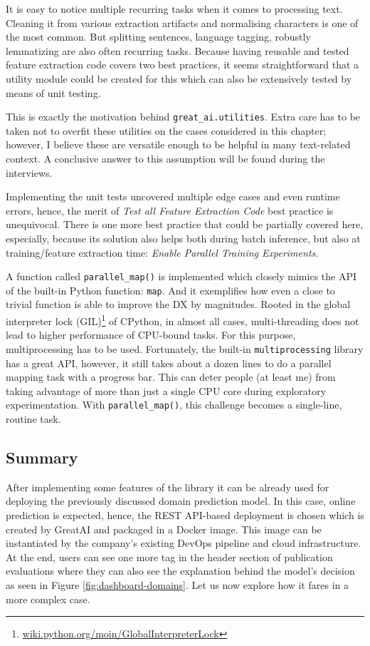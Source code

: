 It is easy to notice multiple recurring tasks when it comes to processing text. Cleaning it from various extraction artifacts and normalising characters is one of the most common. But splitting sentences, language tagging, robustly lemmatizing are also often recurring tasks. Because having reusable and tested feature extraction code covers two best practices, it seems straightforward that a utility module could be created for this which can also be extensively tested by means of unit testing.

This is exactly the motivation behind \texttt{great\_ai.utilities}. Extra care has to be taken not to overfit these utilities on the cases considered in this chapter; however, I believe these are versatile enough to be helpful in many text-related context. A conclusive answer to this assumption will be found during the interviews.

Implementing the unit tests uncovered multiple edge cases and even runtime errors, hence, the merit of \textit{Test all Feature Extraction Code} best practice is unequivocal. There is one more best practice that could be partially covered here, especially, because its solution also helps both during batch inference, but also at training/feature extraction time: \textit{Enable Parallel Training Experiments}.

A function called \texttt{parallel\_map()} is implemented which closely mimics the API of the built-in Python function: \texttt{map}. And it exemplifies how even a close to trivial function is able to improve the DX by magnitudes. Rooted in the global interpreter lock (GIL)\footnote{\href{https://wiki.python.org/moin/GlobalInterpreterLock}{wiki.python.org/moin/GlobalInterpreterLock}} of CPython, in almost all cases, multi-threading does not lead to higher performance of CPU-bound tasks. For this purpose, multiprocessing has to be used. Fortunately, the built-in \texttt{multiprocessing} library has a great API, however, it still takes about a dozen lines to do a parallel mapping task with a progress bar. This can deter people (at least me) from taking advantage of more than just a single CPU core during exploratory experimentation. With \texttt{parallel\_map()}, this challenge becomes a single-line, routine task. 

\subsection{Summary}

After implementing some features of the library it can be already used for deploying the previously discussed domain prediction model. In this case, online prediction is expected, hence, the REST API-based deployment is chosen which is created by GreatAI and packaged in a Docker image. This image can be instantiated by the company's existing DevOps pipeline and cloud infrastructure. At the end, users can see one more tag in the header section of publication evaluations where they can also see the explanation behind the model's decision as seen in Figure \ref{fig:dashboard-domains}. Let us now explore how it fares in a more complex case.

